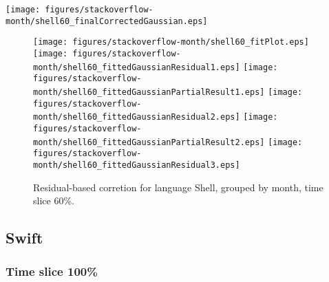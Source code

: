 \begin{center}
{\texttt{[image: figures/stackoverflow-month/shell60\_finalCorrectedGaussian.eps]}}
\end{center}

\FloatBarrier

\begin{figure}[t]
\centering
{}
{\texttt{[image: figures/stackoverflow-month/shell60\_fitPlot.eps]}}
{\texttt{[image: figures/stackoverflow-month/shell60\_fittedGaussianResidual1.eps]}}
{\texttt{[image: figures/stackoverflow-month/shell60\_fittedGaussianPartialResult1.eps]}}
{\texttt{[image: figures/stackoverflow-month/shell60\_fittedGaussianResidual2.eps]}}
{\texttt{[image: figures/stackoverflow-month/shell60\_fittedGaussianPartialResult2.eps]}}
{\texttt{[image: figures/stackoverflow-month/shell60\_fittedGaussianResidual3.eps]}}
\caption{Residual-based corretion for language Shell, grouped by month, time slice 60\%.}
\end{figure}


\FloatBarrier


\subsection{Swift}

\subsubsection{Time slice 100\%}

